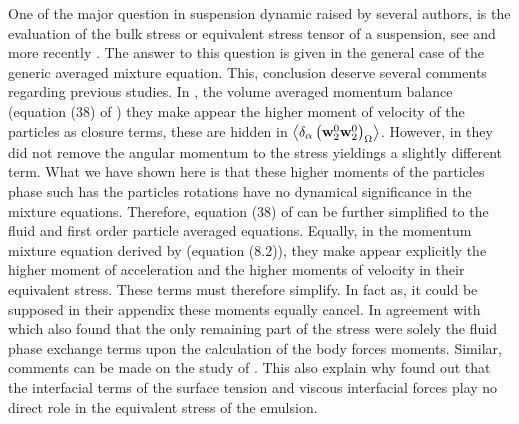 One of the major question in suspension dynamic raised by several authors, is the evaluation of the bulk stress or equivalent stress tensor of a suspension, see \citep{prosperetti2006stress, batchelor1970stress,zhang1997momentum,nadim1996concise} and more recently \citet{dolata2020heterogeneous}. 
The answer to this question is given in the general case of the generic averaged mixture equation. 
This, conclusion deserve several comments regarding previous studies. 
In  \citet{jackson1997locally},  the volume averaged momentum balance (equation (38) of \citet{jackson1997locally}) they make appear the higher moment of velocity of the particles as closure terms, these are hidden in $\left<\delta_\alpha \left( \textbf{w}_2^0 \textbf{w}_2^0 \right)_\Omega\right>$.
However, in \citet{jackson1997locally} they did not remove the angular momentum to the stress yieldings a slightly different term. 
What we have shown here is that these higher moments of the particles phase such has the particles rotations have no dynamical significance in the mixture equations. 
Therefore, equation (38) of \citet{jackson1997locally} can be further simplified to the fluid and first order particle averaged equations. 
Equally, in the momentum mixture equation derived by \citet{zhang1997momentum} (equation (8.2)), they make appear explicitly the higher moment of acceleration and the higher moments of velocity in their equivalent stress. 
These terms must therefore simplify. 
In fact as, it could be supposed in their appendix these moments equally cancel. 
In agreement with \citet{dolata2021faxen} which also found that the only remaining part of the stress were solely the fluid phase exchange terms upon the calculation of the body forces moments. 
Similar, comments can be made on the study of \citet{prosperetti2006stress}. 
This also explain why \citet{nadim1996concise} found out that the interfacial terms of the surface tension and viscous interfacial forces play no direct role in the equivalent stress of the emulsion.